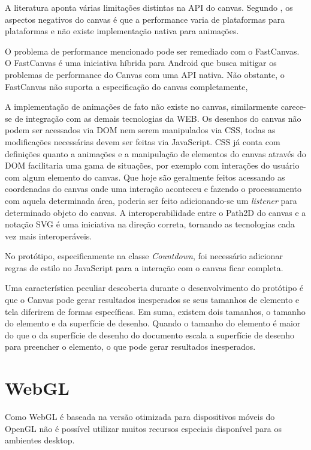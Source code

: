 \begin{draft}
A literatura aponta várias limitações distintas na API do canvas.
Segundo \autocite{html5mostwanted}, os aspectos negativos do canvas é
que a performance varia de plataformas para plataformas e não existe
implementação nativa para animações.

O problema de performance  mencionado pode ser remediado com o FastCanvas.
O FastCanvas é uma iniciativa híbrida para Android que busca mitigar os
problemas de performance do Canvas com uma API nativa. Não obstante, o
FastCanvas não suporta a especificação do canvas completamente,

A implementação de animações de fato não existe no canvas,
similarmente carece-se de integração com as demais tecnologias
da WEB. Os desenhos do canvas não podem ser acessados via DOM nem
serem manipulados via CSS, todas as modificações necessárias devem
ser feitas via JavaScript. CSS já conta com definições quanto a
animações e a manipulação de elementos do canvas através do DOM
facilitaria uma gama de situações, por exemplo com interações do
usuário com algum elemento do canvas. Que hoje são geralmente feitos
acessando as coordenadas do canvas onde uma interação aconteceu e
fazendo o processamento com aquela determinada área, poderia ser feito
adicionando-se um \textit{listener} para determinado objeto do canvas.
A interoperabilidade entre o Path2D do canvas e a notação SVG é uma iniciativa
na direção correta, tornando as tecnologias cada vez mais interoperáveis.

No protótipo, especificamente na classe \textit{Countdown}, foi necessário
adicionar regras de estilo no JavaScript para  a interação com o canvas
ficar completa.

Uma característica peculiar descoberta durante o desenvolvimento
do protótipo é que o Canvas pode gerar resultados inesperados se
seus tamanhos de elemento e tela diferirem de formas específicas. Em
suma, existem dois tamanhos, o tamanho do elemento e da superfície de
desenho. Quando o tamanho do elemento é maior do que o da superfície
de desenho do documento escala a superfície de desenho para preencher o
elemento, o que pode gerar resultados inesperados.

\section{WebGL}

Como WebGL é baseada na versão otimizada para dispositivos móveis do
OpenGL não é possível utilizar muitos recursos especiais disponível
para os ambientes desktop.


\end{draft}
